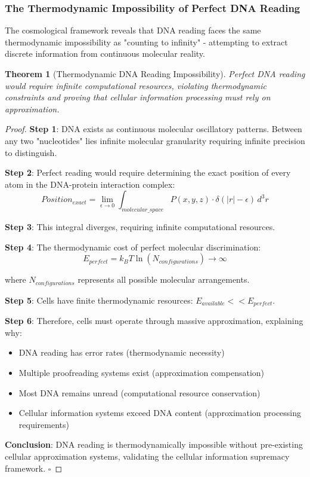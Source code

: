 \documentclass[12pt,a4paper]{article}
\newtheorem{theorem}{Theorem}[section]
\begin{document}
\subsubsection{The Thermodynamic Impossibility of Perfect DNA Reading}

The cosmological framework reveals that DNA reading faces the same thermodynamic impossibility as "counting to infinity" - attempting to extract discrete information from continuous molecular reality.

\begin{theorem}[Thermodynamic DNA Reading Impossibility]
Perfect DNA reading would require infinite computational resources, violating thermodynamic constraints and proving that cellular information processing must rely on approximation.
\end{theorem}

\begin{proof}
\textbf{Step 1}: DNA exists as continuous molecular oscillatory patterns. Between any two "nucleotides" lies infinite molecular granularity requiring infinite precision to distinguish.

\textbf{Step 2}: Perfect reading would require determining the exact position of every atom in the DNA-protein interaction complex:
$$Position_{exact} = \lim_{\epsilon \to 0} \int_{molecular\_space} P(x,y,z) \cdot \delta(|r| - \epsilon) \, d^3r$$

\textbf{Step 3}: This integral diverges, requiring infinite computational resources.

\textbf{Step 4}: The thermodynamic cost of perfect molecular discrimination:
$$E_{perfect} = k_B T \ln(N_{configurations}) \to \infty$$

where $N_{configurations}$ represents all possible molecular arrangements.

\textbf{Step 5}: Cells have finite thermodynamic resources: $E_{available} << E_{perfect}$.

\textbf{Step 6}: Therefore, cells must operate through massive approximation, explaining why:
\begin{itemize}
\item DNA reading has error rates (thermodynamic necessity)
\item Multiple proofreading systems exist (approximation compensation)
\item Most DNA remains unread (computational resource conservation)
\item Cellular information systems exceed DNA content (approximation processing requirements)
\end{itemize}

\textbf{Conclusion}: DNA reading is thermodynamically impossible without pre-existing cellular approximation systems, validating the cellular information supremacy framework. $\square$
\end{proof}
\end{document}
